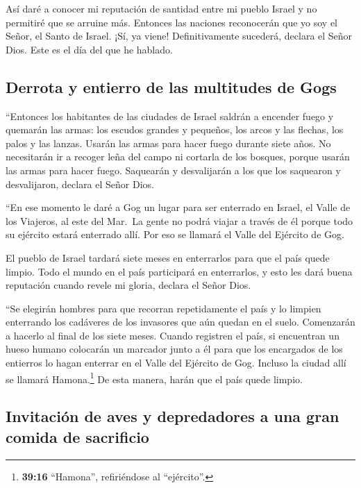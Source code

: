  Así daré a conocer mi reputación de santidad entre mi
pueblo Israel y no permitiré que se arruine más. Entonces las naciones
reconocerán que yo soy el Señor, el Santo de Israel.  ¡Sí,
ya viene! Definitivamente sucederá, declara el Señor Dios. Este es el
día del que he hablado.

\hypertarget{derrota-y-entierro-de-las-multitudes-de-gogs}{%
\subsection{Derrota y entierro de las multitudes de
Gogs}\label{derrota-y-entierro-de-las-multitudes-de-gogs}}

 ``Entonces los habitantes de las ciudades de Israel
saldrán a encender fuego y quemarán las armas: los escudos grandes y
pequeños, los arcos y las flechas, los palos y las lanzas. Usarán las
armas para hacer fuego durante siete años.  No
necesitarán ir a recoger leña del campo ni cortarla de los bosques,
porque usarán las armas para hacer fuego. Saquearán y desvalijarán a los
que los saquearon y desvalijaron, declara el Señor Dios.

 ``En ese momento le daré a Gog un lugar para ser
enterrado en Israel, el Valle de los Viajeros, al este del Mar.~La gente
no podrá viajar a través de él porque todo su ejército estará enterrado
allí. Por eso se llamará el Valle del Ejército de Gog.

 El pueblo de Israel tardará siete meses en enterrarlos
para que el país quede limpio.  Todo el mundo en el país
participará en enterrarlos, y esto les dará buena reputación cuando
revele mi gloria, declara el Señor Dios.

 ``Se elegirán hombres para que recorran repetidamente el
país y lo limpien enterrando los cadáveres de los invasores que aún
quedan en el suelo. Comenzarán a hacerlo al final de los siete meses.
 Cuando registren el país, si encuentran un hueso humano
colocarán un marcador junto a él para que los encargados de los
entierros lo hagan enterrar en el Valle del Ejército de Gog.
 Incluso la ciudad allí se llamará Hamona.\footnote{\textbf{39:16}
  ``Hamona'', refiriéndose al ``ejército''.} De esta manera, harán que
el país quede limpio.

\hypertarget{invitaciuxf3n-de-aves-y-depredadores-a-una-gran-comida-de-sacrificio}{%
\subsection{Invitación de aves y depredadores a una gran comida de
sacrificio}\label{invitaciuxf3n-de-aves-y-depredadores-a-una-gran-comida-de-sacrificio}}

